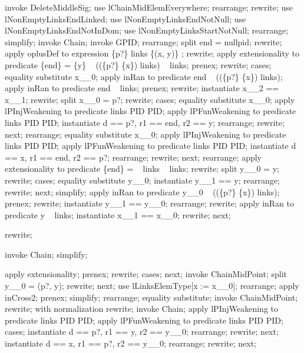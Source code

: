 \begin{LPScript}\begin{forget}[lEndEquivalenceLemma]
invoke DeleteMiddleSig;
use lChainMidElemEverywhere;
rearrange;
rewrite;
use lNonEmptyLinksEndLinked;
use lNonEmptyLinksEndNotNull;
use lNonEmptyLinksEndNotInDom;
use lNonEmptyLinksStartNotNull;
rearrange;
simplify;
invoke Chain;
invoke GPID;
rearrange;
split \lnot  end = nullpid;
rewrite;
apply oplusDef to expression \{p?\} \ndres links \oplus \{(x, y)\} ;
rewrite;
apply extensionality to predicate \{end\} = \{y\} \cup  \ran~  ((\{p?\} \cup  \{x\}) \ndres  links) \setminus  \dom~ links;
prenex;
rewrite;
cases;
equality substitute x\_\_0;
apply inRan to predicate end \in  \ran~  ((\{p?\} \cup  \{x\}) \ndres  links);
apply inRan to predicate end \in  \ran~  links;
prenex;
rewrite;
instantiate x\_\_2 == x\_\_1;
rewrite;
split x\_\_0 = p?;
rewrite;
cases;
equality substitute x\_\_0;
apply lPInjWeakening to predicate links \in  PID \pinj  PID;
apply lPFunWeakening to predicate links \in  PID \pfun  PID;
instantiate d == p?, r1 == end, r2 == y;
rearrange;
rewrite;
next;
rearrange;
equality substitute x\_\_0;
apply lPInjWeakening to predicate links \in  PID \pinj  PID;
apply lPFunWeakening to predicate links \in  PID \pfun  PID;
instantiate d == x, r1 == end, r2 == p?;
rearrange;
rewrite;
next;
rearrange;
apply extensionality to predicate \{end\} = \ran~  links \setminus  \dom~ links;
rewrite;
split y\_\_0 = y;
rewrite;
cases;
equality substitute y\_\_0;
instantiate y\_\_1 == y;
rearrange;
rewrite;
next;
simplify;
apply inRan to predicate y\_\_0 \in  \ran~  ((\{p?\} \cup  \{x\}) \ndres  links);
prenex;
rewrite;
instantiate y\_\_1 == y\_\_0;
rearrange;
rewrite;
apply inRan to predicate y \in  \ran~  links;
instantiate x\_\_1 == x\_\_0;
rewrite;
next;
\end{forget}\end{LPScript}

\begin{forget}
rewrite;
\end{forget}

\begin{forget}[lChainLinks]
invoke Chain;
simplify;
\end{forget}

\begin{forget}[lChainMidPointLinksMidPointEquiv]
apply extensionality;
prenex;
rewrite;
cases;
next;
invoke ChainMidPoint;
split y\_\_0 = (p?, y);
rewrite;
next;
use lLinksElemType[x := x\_\_0];
rearrange;
apply inCross2;
prenex;
simplify;
rearrange;
equality substitute;
invoke ChainMidPoint;
rewrite;
with normalization rewrite;
invoke Chain;
apply lPInjWeakening to predicate links \in  PID \pinj  PID;
apply lPFunWeakening to predicate links \in  PID \pfun  PID;
cases;
instantiate d == p?, r1 == y, r2 == y\_\_0;
rearrange;
rewrite;
next;
instantiate d == x, r1 == p?, r2 == y\_\_0;
rearrange;
rewrite;
next;
\end{forget}

